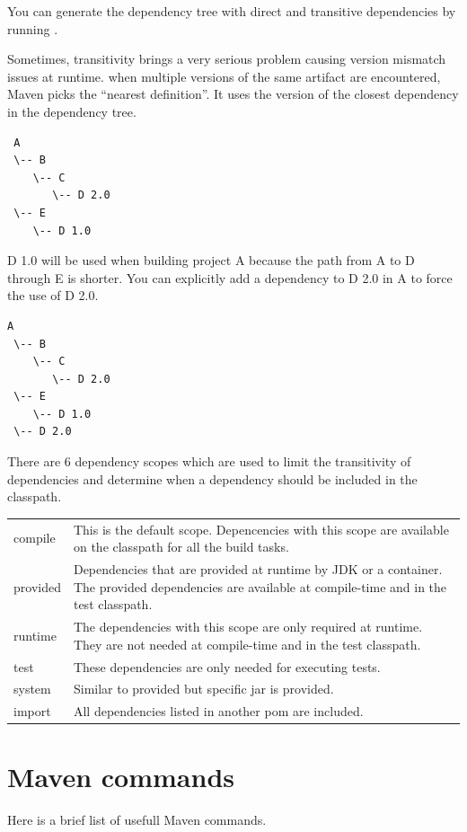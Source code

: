 You can generate the dependency tree with direct and transitive dependencies by running
 .

Sometimes, transitivity brings a very serious problem causing version mismatch issues at runtime.
when multiple versions of the same artifact are encountered, Maven picks the ``nearest definition''. It uses the version of the closest dependency in the dependency tree.

\begin{verbatim}
 A
 \-- B
    \-- C
       \-- D 2.0
 \-- E
    \-- D 1.0
\end{verbatim}

D 1.0 will be used when building project A because the path from A to D through E is shorter. You can explicitly add a dependency to D 2.0 in A to force the use of D 2.0.

\begin{verbatim}
A
 \-- B
    \-- C
       \-- D 2.0
 \-- E
    \-- D 1.0
 \-- D 2.0
 \end{verbatim}

There are 6 dependency scopes which are used to limit the transitivity of dependencies and determine when a dependency should be included in the classpath.

\begin{tabularx}{\textwidth}{ |l|X| } 
 \hline
 compile & 
This is the default scope. Depencencies with this scope are available on the classpath for all the build tasks.\\
provided &
Dependencies that are provided at runtime by JDK or a container. The provided dependencies are available at compile-time and in the test classpath.\\
runtime &
The dependencies with this scope are only required at runtime. They are not needed at compile-time and in the test classpath.\\
test &
These dependencies are only needed for executing tests.\\
system &
Similar to provided but specific jar is provided.\\ 
import &
All dependencies listed in another pom are included.\\
\hline
\end{tabularx}


\section{Maven commands}

Here is a brief list of usefull Maven commands.

